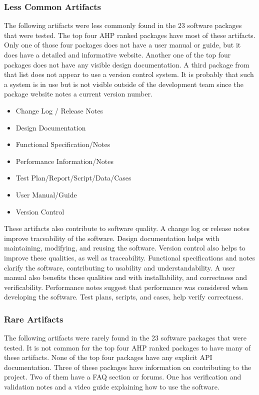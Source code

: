 \documentclass[12pt, notitlepage]{article}
\begin{document}
\subsubsection{Less Common Artifacts}
The following artifacts were less commonly found in the 23 software packages that were tested. The top four AHP ranked packages have most of these artifacts.
Only one of those four packages does not have a user manual or guide, but it does have a detailed and informative website. Another one of the top four packages does not have any visible design documentation. A third package from that list does not appear to use a version control system. It is probably that such a system is in use but is not visible outside of the development team since the package website notes a current version number. 

\begin{singlespace}
	\begin{multicols}{2}	
		\begin{itemize}
			\item Change Log / Release Notes
			\item Design Documentation
			\item Functional Specification/Notes	
			\item Performance Information/Notes
			\item Test Plan/Report/Script/Data/Cases
			\item User Manual/Guide
			\item Version Control
		\end{itemize}
	\end{multicols}
\end{singlespace}

These artifacts also contribute to software quality. A change log or release notes improve traceability of the software. Design documentation helps with maintaining, modifying, and reusing the software. Version control also helps to improve these qualities, as well as traceability. Functional specifications and notes clarify the software, contributing to usability and understandability. A user manual also benefits those qualities and with installability, and correctness and verificability. Performance notes suggest that performance was considered when developing the software. Test plans, scripts, and cases, help verify correctness. 


\subsubsection{Rare Artifacts}
The following artifacts were rarely found in the 23 software packages that were tested. It is not common for the top four AHP ranked packages to have many of these artifacts. None of the top four packages have any explicit API documentation. Three of these packages have information on contributing to the project. Two of them have a FAQ section or forums. One has verification and validation notes and a video guide explaining how to use the software. 
\end{document}
